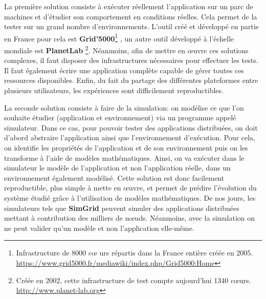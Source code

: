 La première solution consiste à exécuter réellement l'application sur un parc de
machines et d'étudier son comportement en conditions réelles. Cela permet de la
tester sur un grand nombre d'environnements. L'outil créé et développé en partie
en France pour cela est \textbf{Grid'5000}\footnote{Infrastructure de 8000 c\oe
  urs répartis dans la France entière créée en
  2005. \\ \url{https://www.grid5000.fr/mediawiki/index.php/Grid5000:Home}} \citep{GRID5000},
un autre outil développé à l'échelle mondiale est
\textbf{PlanetLab} \footnote{Créée en 2002, cette infrastructure de test compte
  aujourd'hui 1340 c\oe urs. \\ \url{http://www.planet-lab.org}}. Néanmoins,
afin de mettre en \oe uvre ces solutions complexes, il faut disposer des
infrastructures nécessaires pour effectuer les tests. Il faut également écrire
une application complète capable de gérer toutes ces ressources
disponibles. Enfin, du fait du partage des différentes plateformes entre
plusieurs utilisateurs, les expériences sont difficilement reproductibles.

La seconde solution consiste à faire de la simulation: on modélise ce que l'on
souhaite étudier (application et environnement) via un programme appelé
simulateur. Dans ce cas, pour pouvoir tester des applications distribuées, on doit d'abord abstraire l'application ainsi que l'environnement
d'exécution. Pour cela, on identifie les propriétés de l'application et de son
environnement puis on les transforme à l'aide de modèles mathématiques. Ainsi,
on va exécuter dans le simulateur le modèle de l'application et non
l'application réelle, dans un environnement également modélisé. Cette solution
est donc facilement reproductible, plus simple à mette en \oe uvre, et permet de
prédire l'évolution du système étudié grâce à l'utilisation de modèles
mathématiques. De nos jours, les simulateurs tels que
\textbf{SimGrid} \citep{casanova:hal-01017319} peuvent simuler des
applications distribuées mettant à contribution des milliers de
n\oe uds. Néanmoins, avec la simulation on ne peut valider qu'un modèle et non
l'application elle-même.

